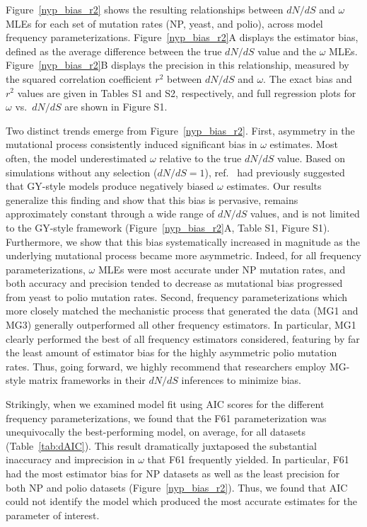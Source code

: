 \documentclass{pnastwo}
\begin{document}
\begin{article}
Figure~\ref{nyp_bias_r2} shows the resulting relationships between $dN/dS$ and $\omega$ MLEs for each set of mutation rates (NP, yeast, and polio), across model frequency parameterizations. Figure~\ref{nyp_bias_r2}A displays the estimator bias, defined as the average difference between the true $dN/dS$ value and the $\omega$ MLEs. Figure~\ref{nyp_bias_r2}B displays the precision in this relationship, measured by the squared correlation coefficient $r^2$ between $dN/dS$ and $\omega$. The exact bias and $r^2$ values are given in Tables S1 and S2, respectively, and full regression plots for $\omega$ vs.\ $dN/dS$ are shown in Figure S1.

Two distinct trends emerge from Figure~\ref{nyp_bias_r2}. First, asymmetry in the mutational process consistently induced significant bias in $\omega$ estimates. Most often, the model underestimated $\omega$ relative to the true $dN/dS$ value. Based on simulations without any selection ($dN/dS = 1$), ref.\ \cite{Yap2010} had previously suggested that GY-style models produce negatively biased $\omega$ estimates. Our results generalize this finding and show that this bias is pervasive, remains approximately constant through a wide range of $dN/dS$ values, and is not limited to the GY-style framework (Figure~\ref{nyp_bias_r2}A, Table S1, Figure S1). Furthermore, we show that this bias systematically increased in magnitude as the underlying mutational process became more asymmetric. Indeed, for all frequency parameterizations, $\omega$ MLEs were most accurate under NP mutation rates, and both accuracy and precision tended to decrease as mutational bias progressed from yeast to polio mutation rates. Second, frequency parameterizations which more closely matched the mechanistic process that generated the data (MG1 and MG3) generally outperformed all other frequency estimators. In particular, MG1 clearly performed the best of all frequency estimators considered, featuring by far the least amount of estimator bias for the highly asymmetric polio mutation rates. Thus, going forward, we highly recommend that researchers employ MG-style matrix frameworks in their $dN/dS$ inferences to minimize bias.

Strikingly, when we examined model fit using AIC scores \cite{Akaike1974,BurnhamAnderson2004} for the different frequency parameterizations, we found that the F61 parameterization was unequivocally the best-performing model, on average, for all datasets (Table~\ref{tab:dAIC}). This result dramatically juxtaposed the substantial inaccuracy and imprecision in $\omega$ that F61 frequently yielded. In particular, F61 had the most estimator bias for NP datasets as well as the least precision for both NP and polio datasets (Figure~\ref{nyp_bias_r2}).  Thus, we found that AIC could not identify the model which produced the most accurate estimates for the parameter of interest.


\end{article}
\end{document}
